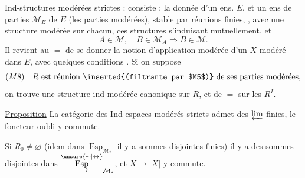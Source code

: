 Ind-structures modérées strictes   : consiste : la donnée d'un ens. $E$, et un ens de parties $\mathcal M_E$ de $E$ (les parties modérées), stable par réunions finies, , avec une structure modérée sur chacun, ces structures s'induisant mutuellement, et
\[
 A\in\mathcal M,\quad B\in\mathcal M_A\Longrightarrow B\in\mathcal M.
\]
Il revient au $=$ de se donner la notion d'application modérée d'un $X$ modéré dans $E$, avec  quelques conditions . Si on suppose
\[
 (M8)\quad R\text{ est réunion \inserted{(filtrante par $M5$)} de ses parties modérées},
\]
on trouve une structure ind-modérée canonique sur $R$, et de $=$ sur les $R^I$.

\uline{Proposition} La catégorie des   Ind-espaces modérés stricts admet des $\varprojlim$ finies, le foncteur oubli y commute.

Si $R_0\ne\varnothing$ (idem dans $\operatorname{Esp}_{\mathcal M_*}$ il y a sommes disjointes finies) il y a des sommes disjointes   dans $\overset{\unsure{\sim|\leftrightarrow}}{\underrightarrow{\operatorname{Esp}}}_{\mathcal M_*}$, et $X\longrightarrow |X|$ y commute.
